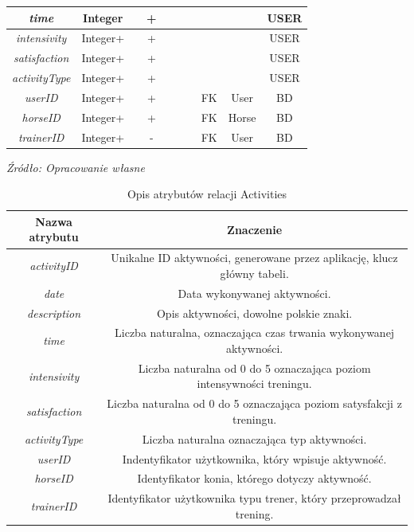\documentclass[12pt,oneside]{report}
\begin{document}
\begin{enumerate}[start=1,label={\bfseries REL\textbackslash0\arabic*}]
\begin{table}[H]
\begin{tabular}{|c|c|c|c|c|c|c|c|c|c|}
			\hline
			\textit{time} & Integer & & + & & & & & &USER\\
			\hline
			\textit{intensivity}  & Integer+ & & + & & & & & &USER\\
			\hline
			\textit{satisfaction} & Integer+ & & + & & & & & &USER\\
			\hline
			\textit{activityType} & Integer+ & & + & & & & & &USER\\
			\hline
			\textit{userID} & Integer+ & & + & & & &FK&User&BD\\
			\hline	
			\textit{horseID} & Integer+ & & + & & & &FK&Horse&BD\\
			\hline
			\textit{trainerID} & Integer+ & & - & & & &FK&User&BD\\
			\hline		
		\end{tabular}
	\end{table}

	\begin{table}[H]
	\caption{Opis atrybutów relacji Activities}
	\textit{Źródło: Opracowanie własne}
	\label{ActivityAttributeDescription}
	\centering
	\begin{tabular}{|c|c|}
\hline
Nazwa atrybutu & Znaczenie \\
\hline
\textit{activityID} & Unikalne ID aktywności, generowane przez aplikację, klucz główny tabeli. \\
\hline
\textit{date} &  Data wykonywanej aktywności.\\
\hline
\textit{description} & Opis aktywności, dowolne polskie znaki.\\
\hline
\textit{time} & Liczba naturalna, oznaczająca czas trwania wykonywanej aktywności.\\
\hline
\textit{intensivity}  & Liczba naturalna od 0 do 5 oznaczająca poziom intensywności treningu.\\
\hline
\textit{satisfaction} & Liczba naturalna od 0 do 5 oznaczająca poziom satysfakcji z treningu.\\
\hline
\textit{activityType} &  Liczba naturalna oznaczająca typ aktywności.\\
			\hline
\textit{userID} & Indentyfikator użytkownika, który wpisuje aktywność.\\
\hline	
\textit{horseID} & Identyfikator konia, którego dotyczy aktywność.\\
\hline
\textit{trainerID} & Identyfikator użytkownika typu trener, który przeprowadzał trening.\\
\hline
	\end{tabular}
\end{table}


\end{enumerate}
\end{document}

